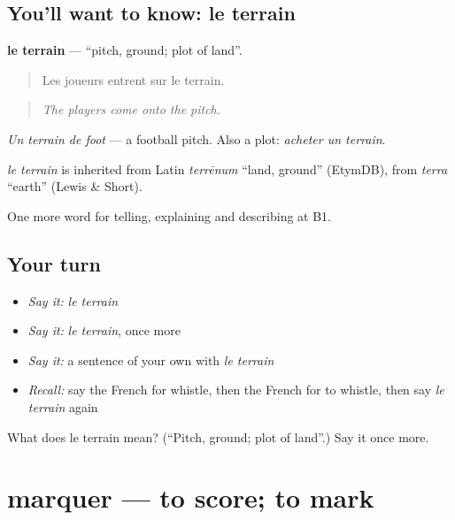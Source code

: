 \subsection*{You'll want to know: le terrain}
\textbf{le terrain} — \textquotedblleft{}pitch, ground; plot of land\textquotedblright{}.

\begin{quote}
Les joueurs entrent sur le terrain.
\end{quote}

\begin{quote}
\emph{The players come onto the pitch.}
\end{quote}

\emph{Un terrain de foot} — a football pitch. Also a plot: \emph{acheter un terrain}.

\begin{cousinweb}
\emph{le terrain} is inherited from Latin \emph{terrēnum} \textquotedblleft{}land, ground\textquotedblright{} (EtymDB), from \emph{terra} \textquotedblleft{}earth\textquotedblright{} (Lewis \& Short).
\end{cousinweb}

\begin{grammarlens}[title={What you've built}]
One more word for telling, explaining and describing at B1.
\end{grammarlens}

\subsection*{Your turn}
\begin{itemize}
\raggedright
  \item \emph{Say it:} \emph{le terrain}
  \item \emph{Say it:} \emph{le terrain}, once more
  \item \emph{Say it:} a sentence of your own with \emph{le terrain}
  \item \emph{Recall:} say the French for whistle, then the French for to whistle, then say \emph{le terrain} again
\end{itemize}

\begin{tcolorbox}[breakable,colback=teal!4,colframe=teal!35!black,title={Before you move on}]
What does le terrain mean? (\textquotedblleft{}Pitch, ground; plot of land\textquotedblright{}.) Say it once more.
\end{tcolorbox}
\section[marquer]{marquer — to score; to mark}

